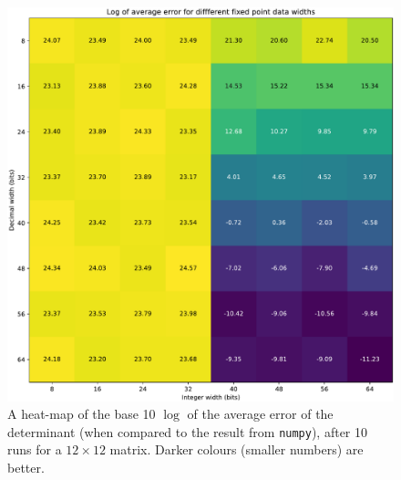 \documentclass[12pt]{article}
\begin{document}
\begin{figure}[thp]
	\centering
	
	\includegraphics[width=\textwidth]{heatmap_full.pdf}
	
	\caption{A heat-map of the base 10 $\log$ of the average error of the determinant (when compared to the result from \lstinline|numpy|), after 10 runs for a $12 \times 12$ matrix. Darker colours (smaller numbers) are better.}
	\label{full_heat}
\end{figure}
\end{document}
